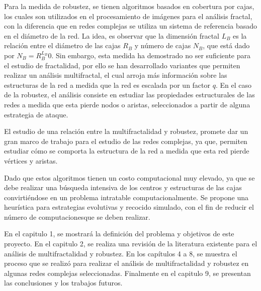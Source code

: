 Para la medida de robustez, se tienen algoritmos basados en cobertura por cajas, los cuales son utilizados en el procesamiento de imágenes para el análisis fractal, con la diferencia que en redes complejas se utiliza un sistema de referencia basado en el diámetro de la red. La idea, es observar que la dimensión fractal $L_B$ es la relación entre el diámetro de las cajas $R_B$ y número de cajas $N_B$, que está dado por $N_B=R_{B}^{L_B}0$. Sin embargo, esta medida ha demostrado no ser suficiente para el estudio de fractalidad, por ello se han desarrollado variantes que permiten realizar un análisis multifractal, el cual arroja más información sobre las estructuras de la red a medida que la red es escalada por un factor $q$. En el caso de la robustez, el análisis consiste en estudiar las propiedades estructurales de las redes a medida que esta pierde nodos o aristas, seleccionados a partir de alguna estrategia de ataque.

El estudio de una relación entre la multifractalidad y robustez, promete dar un gran marco de trabajo para el estudio de las redes complejas, ya que, permiten estudiar cómo se comporta la estructura de la red a medida que esta red pierde vértices y aristas.

Dado que estos algoritmos tienen un costo computacional muy elevado, ya que se debe realizar una búsqueda intensiva de los centros y estructuras de las cajas convirtiéndose en un problema intratable computacionalmente. Se propone una heurística para estrategias evolutivas y recocido simulado, con el fin de reducir el número de computacionesque se deben realizar.

En el capitulo 1, se mostrará la definición del problema y objetivos de este proyecto. En el capitulo 2, se realiza una revisión de la literatura existente para el análisis de multifractalidad y robustez. En los capítulos 4 a 8, se muestra el proceso que se realizó para realizar el análisis de multifractalidad y robustez en algunas redes complejas seleccionadas. Finalmente en el capitulo 9, se presentan las conclusiones y los trabajos futuros.